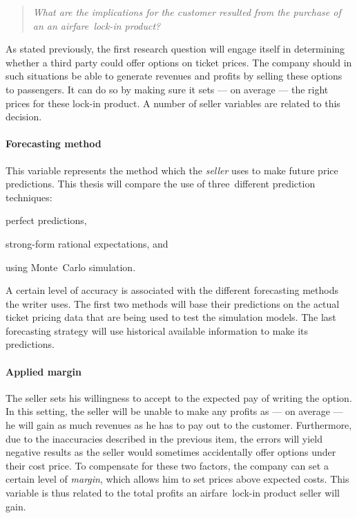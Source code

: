 \begin{quote}\emph{What are the implications for the customer resulted from the purchase of an an airfare~lock-in product?}\end{quote}

As stated previously, the first research question will engage itself in determining whether a third party could offer options on ticket prices. The company should in such situations be able to generate revenues and profits by selling these options to passengers. It can do so by making sure it sets --- on average --- the right prices for these lock-in product. A number of seller variables are related to this decision.

\paragraph{Forecasting method} This variable represents the method which the \emph{seller} uses to make future price predictions. This thesis will compare the use of three~different prediction techniques:
\begin{compactitem}
    \item perfect predictions,
    \item strong-form rational expectations, and
    \item using Monte~Carlo simulation.
\end{compactitem}

A certain level of accuracy is associated with the different forecasting methods the writer uses. The first two methods will base their predictions on the actual ticket pricing data that are being used to test the simulation models. The last forecasting strategy will use historical available information to make its predictions.

\paragraph{Applied margin} The seller sets his willingness to accept to the expected pay of writing the option. In this setting, the seller will be unable to make any profits as --- on average --- he will gain as much revenues as he has to pay out to the customer. Furthermore, due to the inaccuracies described in the previous item, the errors will yield negative results as the seller would sometimes accidentally offer options under their cost price. To compensate for these two factors, the company can set a certain level of \emph{margin}, which allows him to set prices above expected costs. This variable is thus related to the total profits an airfare~lock-in product seller will gain.


